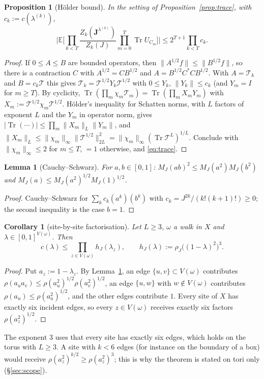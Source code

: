 \documentclass[11pt,a4paper]{article}
\theoremstyle{plain}
\newtheorem{proposition}[theorem]{Proposition}
\newtheorem{lemma}[theorem]{Lemma}
\newtheorem{corollary}[theorem]{Corollary}
\theoremstyle{remark}
\numberwithin{equation}{section}
\newcommand{\E}{\mathbb{E}}
\newcommand{\Tr}{\operatorname{Tr}}
\newcommand{\cT}{\mathcal{T}}
\newcommand{\bs}{\boldsymbol}
\begin{document}
\begin{proposition}[Hölder bound]\label{prop:holder}
In the setting of Proposition~\ref{prop:trace}, with $c_k:=c(\lambda^{(k)})$,
\[
\Big|\E\Big[\prod_{k<T}\frac{Z_k(\bs J^{\lambda^{(k)}})}{Z_k(J)}\prod_{m=0}^T\Tr U_{C_m}\Big]\Big|\le2^{T+1}\prod_{k<T}c_k .
\]
\end{proposition}
\begin{proof}
If $0\le A\le B$ are bounded operators, then $\|A^{1/2}f\|\le\|B^{1/2}f\|$, so there is a contraction $C$ with $A^{1/2}=CB^{1/2}$
\cite{Dou66} and $A=B^{1/2}C^*CB^{1/2}$. With $A=\cT_k$ and $B=c_k\cT$ this gives $\cT_k=\cT^{1/2}Y_k\cT^{1/2}$ with $0\le Y_k$,
$\|Y_k\|\le c_k$ (and $Y_m=I$ for $m\ge T$). By cyclicity, $\Tr(\prod_m\chi_m\cT_m)=\Tr(\prod_mX_mY_m)$ with
$X_m:=\cT^{1/2}\chi_m\cT^{1/2}$. Hölder's inequality for Schatten norms, with $L$ factors of exponent $L$ and the $Y_m$ in operator
norm, gives $|\Tr(\cdots)|\le\prod_m\|X_m\|_L\|Y_m\|$, and $\|X_m\|_L\le\|\chi_m\|_\infty\|\cT^{1/2}\|_{2L}^2=\|\chi_m\|_\infty
(\Tr\cT^L)^{1/L}$. Conclude with $\|\chi_m\|_\infty\le2$ for $m\le T$, $=1$ otherwise, and \eqref{eq:trace}.
\end{proof}

\begin{lemma}[Cauchy--Schwarz]\label{lem:cs}
For $a,b\in[0,1]$: $M_J(ab)^2\le M_J(a^2)M_J(b^2)$ and $M_J(a)\le M_J(a^2)^{1/2}M_J(1)^{1/2}$.
\end{lemma}
\begin{proof}
Cauchy--Schwarz for $\sum_kc_k(a^k)(b^k)$ with $c_k=J^{2k}/(k!(k+1)!)\ge0$; the second inequality is the case $b=1$.
\end{proof}

\begin{corollary}[site-by-site factorisation]\label{cor:site}
Let $L\ge3$, $\omega$ a walk in $X$ and $\lambda\in[0,1]^{V(\omega)}$. Then
\[
c(\lambda)\le\prod_{z\in V(\omega)}h_J(\lambda_z),\qquad h_J(\lambda):=\rho_J\big((1-\lambda)^2\big)^3 .
\]
\end{corollary}
\begin{proof}
Put $a_z:=1-\lambda_z$. By Lemma~\ref{lem:cs}, an edge $\{u,v\}\subset V(\omega)$ contributes $\rho(a_ua_v)\le\rho(a_u^2)^{1/2}
\rho(a_v^2)^{1/2}$, an edge $\{u,w\}$ with $w\notin V(\omega)$ contributes $\rho(a_u)\le\rho(a_u^2)^{1/2}$, and the other edges
contribute $1$. Every site of $X$ has exactly six incident edges, so every $z\in V(\omega)$ receives exactly six factors
$\rho(a_z^2)^{1/2}$.
\end{proof}
\noindent The exponent $3$ uses that every site has exactly six edges, which holds on the torus with $L\ge3$. A site with $k<6$ edges
(for instance on the boundary of a box) would receive $\rho(a_z^2)^{k/2}\ge\rho(a_z^2)^3$; this is why the theorem is stated on tori
only (\S\ref{sec:scope}).
\end{document}

